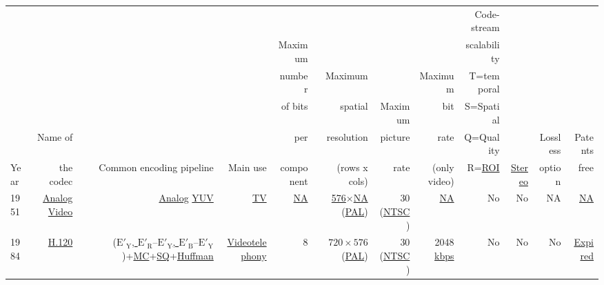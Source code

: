 \begin{tabular}{lrrrrrrrrrrr}
     &           &                          &          &           &              &         &              & Code-stream & & & \\
     &           &                          &          &   Maximum &              &         &              & scalability & & & \\
     &           &                          &          &     number&      Maximum &         &      Maximum &  T=temporal & & & \\
     &           &                          &          &   of bits &      spatial & Maximum &          bit &   S=Spatial & & & \\
     &   Name of &                          &          &       per &   resolution & picture &         rate &   Q=Quality & & Lossless & Patents \\
Year & the codec & Common encoding pipeline & Main use & component &(rows x cols) &    rate & (only video) &       R=\href{https://en.wikipedia.org/wiki/Region_of_interest}{ROI} & \href{https://en.wikipedia.org/wiki/Stereoscopy}{Stereo} & option & free\\
\hline

1951 & %
\href{https://en.wikipedia.org/wiki/Video#Analog_video}{Analog Video} & %
\href{https://en.wikipedia.org/wiki/Analog_signal}{Analog} \href{https://en.wikipedia.org/wiki/YUV}{YUV} & %
\href{https://en.wikipedia.org/wiki/Television}{TV} & %
\href{https://en.wikipedia.org/wiki/N/A}{NA} & %
\href{https://en.wikipedia.org/wiki/Interlaced_video}{576}$\times$\href{https://en.wikipedia.org/wiki/N/A}{NA} (\href{https://en.wikipedia.org/wiki/PAL}{PAL}) & %
30 (\href{https://en.wikipedia.org/wiki/NTSC}{NTSC}) & %
\href{https://en.wikipedia.org/wiki/N/A}{NA} & %
No & %
No & %
NA & %
\href{https://en.wikipedia.org/wiki/N/A}{NA} \\ %

1984 & %
\href{https://en.wikipedia.org/wiki/H.120}{H.120} & %
(\href{https://en.wikipedia.org/wiki/Chroma_subsampling#4:2:2}{$\text{E}'_{\text{Y}}$, $\text{E}'_{\text{R}} – \text{E}'_{\text{Y}}$, $\text{E}'_{\text{B}} – \text{E}'_{\text{Y}}$})+\href{https://en.wikipedia.org/wiki/Motion_compensation}{MC}+\href{https://en.wikipedia.org/wiki/Quantization_(signal_processing)}{SQ}+\href{https://en.wikipedia.org/wiki/Huffman_coding}{Huffman} & %
\href{https://en.wikipedia.org/wiki/Videotelephony}{Videotelephony} & %
8 & %
$720\times 576$ (\href{https://en.wikipedia.org/wiki/PAL}{PAL}) & %
30 (\href{https://en.wikipedia.org/wiki/NTSC}{NTSC}) & %
2048 \href{https://en.wikipedia.org/wiki/Data-rate_units}{kbps} & %
No & %
No & %
No & %
\href{https://en.wikipedia.org/wiki/Term_of_patent}{Expired} \\ %


\end{tabular}
